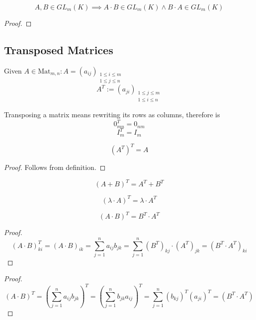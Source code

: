 \begin{corollary}
   \[A, B \in GL_m(K) \implies A \cdot B \in GL_m(K) \land B \cdot A \in GL_m(K)\]
\end{corollary}
\begin{proof}
\end{proof}

\subsection{Transposed Matrices}
\begin{definition}
   Given \(A \in \text{Mat}_{m,n} : A = (a_{ij})_{\substack{1 \leq i \leq m \\ 1 \leq j \leq n}}\)
   \[A^T := (a_{ji})_{\substack{1 \leq j \leq m \\ 1 \leq i \leq n}}\]
\end{definition}
\begin{remark}
   Transposing a matrix means rewriting its rows as columns, therefore is
   \[0_{mn}^T = 0_{nm}\]
   \[I_{m}^T = I_{m}\]
\end{remark}

\begin{proposition}[\((A^T)^T\)]
   \[(A^T)^T = A\]
\end{proposition}
\begin{proof}
   Follows from definition.
\end{proof}

\begin{proposition}[\((A + B)^T\)]
   \[(A + B)^T = A^T + B^T\]
\end{proposition}

\begin{proposition}
   \[(\lambda \cdot A)^T = \lambda \cdot A^T\]
\end{proposition}

\begin{proposition}[\((A \cdot B)^T\)]
   \[(A \cdot B)^T = B^T \cdot A^T\]
\end{proposition}
\begin{proof}
   \[(A \cdot B)_{ki}^T = (A \cdot B)_{ik} = \sum_{j=1}^n a_{ij} b_{jk} = \sum_{j=1}^n (B^T)_{kj} \cdot (A^T)_{jk} = (B^T \cdot A^T)_{ki}\]
\end{proof}
\begin{proof}
   \[(A \cdot B)^T = \left(\displaystyle\sum_{j=1}^n a_{ij} b_{jk}\right)^T = \left(\displaystyle\sum_{j=1}^n b_{jk} a_{ij}\right)^T = \displaystyle\sum_{j=1}^n (b_{kj})^T (a_{ji})^T = (B^T \cdot A^T)\]
\end{proof}

